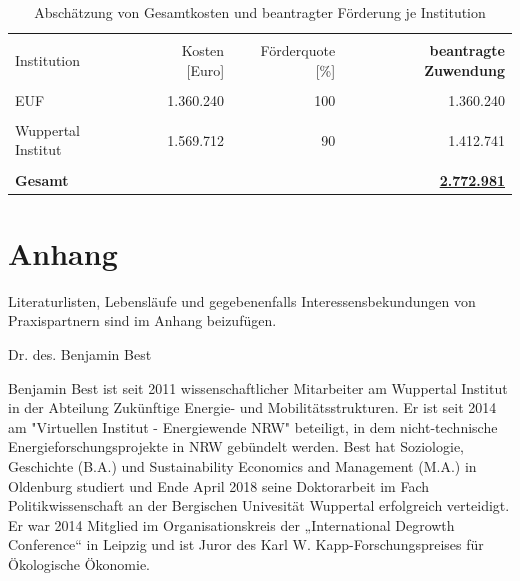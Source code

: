 \documentclass[a4paper,11pt,twoside]{scrartcl}
\begin{document}
\begin{table}[h]
\begin{center}
  \caption{Abschätzung von Gesamtkosten und beantragter Förderung je Institution}
\begin{tabular}[h]{|l | r | r | r|}
\hline
&&&\\
Institution & Kosten [Euro] & Förderquote [\%] & \textbf{beantragte Zuwendung}\\
\hline
\hline
 &&&\\
 EUF & 1.360.240 & 100 & 1.360.240\\
 \hline
 &&&\\
 Wuppertal Institut & 1.569.712 & 90 & 1.412.741

\\
 \hline
 \hline
 &&&\\
 \textbf{Gesamt} & & &\underline{\textbf{2.772.981}}\\
 \hline
 \end{tabular}
 \label{tab:kostenkalkulation2}
\end{center}
\end{table}

\clearpage


%


\clearpage
\appendix

\section{Anhang}

Literaturlisten, Lebensläufe und gegebenenfalls Interessensbekundungen von Praxispartnern sind im Anhang beizufügen.

Dr. des. Benjamin Best 

Benjamin Best ist seit 2011 wissenschaftlicher Mitarbeiter am Wuppertal Institut in der Abteilung Zukünftige Energie- und Mobilitätsstrukturen. Er ist seit 2014 am "Virtuellen Institut - Energiewende NRW" beteiligt, in dem nicht-technische Energieforschungsprojekte in NRW gebündelt werden. Best hat Soziologie, Geschichte (B.A.) und Sustainability Economics and Management (M.A.) in Oldenburg studiert und Ende April 2018 seine Doktorarbeit im Fach Politikwissenschaft an der Bergischen Univesität Wuppertal erfolgreich verteidigt. Er war 2014 Mitglied im Organisationskreis der „International Degrowth Conference“ in Leipzig und ist Juror des Karl W. Kapp-Forschungspreises für Ökologische Ökonomie. 
\end{document}
